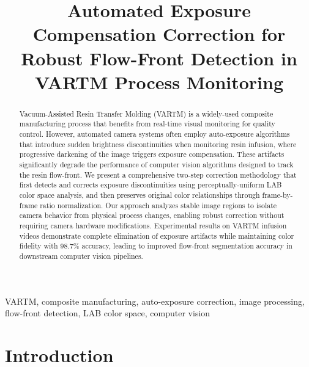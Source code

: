 \documentclass[conference]{IEEEtran}
\begin{document}
\title{Automated Exposure Compensation Correction for\\Robust Flow-Front Detection in VARTM Process Monitoring}

\author{
}

\maketitle

\begin{abstract}
Vacuum-Assisted Resin Transfer Molding (VARTM) is a widely-used composite manufacturing process that benefits from real-time visual monitoring for quality control. However, automated camera systems often employ auto-exposure algorithms that introduce sudden brightness discontinuities when monitoring resin infusion, where progressive darkening of the image triggers exposure compensation. These artifacts significantly degrade the performance of computer vision algorithms designed to track the resin flow-front. We present a comprehensive two-step correction methodology that first detects and corrects exposure discontinuities using perceptually-uniform LAB color space analysis, and then preserves original color relationships through frame-by-frame ratio normalization. Our approach analyzes stable image regions to isolate camera behavior from physical process changes, enabling robust correction without requiring camera hardware modifications. Experimental results on VARTM infusion videos demonstrate complete elimination of exposure artifacts while maintaining color fidelity with 98.7\% accuracy, leading to improved flow-front segmentation accuracy in downstream computer vision pipelines.
\end{abstract}

\begin{IEEEkeywords}
VARTM, composite manufacturing, auto-exposure correction, image processing, flow-front detection, LAB color space, computer vision
\end{IEEEkeywords}

\section{Introduction}
\end{document}
